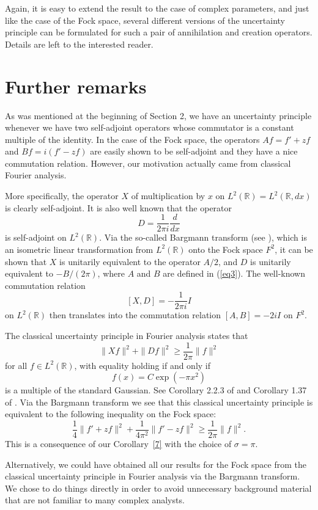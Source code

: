 \documentclass[12pt,reqno]{amsart}
\begin{document}
Again, it is easy to extend the result to the case of complex parameters, and just like the case of the Fock
space, several different versions of the uncertainty principle can be formulated for such a pair of annihilation
and creation operators. Details are left to the interested reader.

\section{Further remarks}

As was mentioned at the beginning of Section 2, we have an uncertainty principle whenever
we have two self-adjoint operators whose commutator is a constant multiple of the identity. In the case
of the Fock space, the operators $Af=f'+zf$ and $Bf=i(f'-zf)$ are easily shown to be self-adjoint and
they have a nice commutation relation. However, our motivation actually came from classical Fourier analysis.

More specifically, the operator $X$ of multiplication by $x$ on $L^2({{\mathbb R}})=L^2({{\mathbb R}},dx)$ is clearly self-adjoint.
It is also well known that the operator 
$$D=\frac1{2\pi i}\frac{d}{dx}$$ 
is self-adjoint on $L^2({{\mathbb R}})$. Via the so-called Bargmann transform (see \cite{F,G,Z}), which is an isometric linear 
transformation from $L^2({{\mathbb R}})$ onto the Fock space $F^2$, it can be shown that $X$ is unitarily equivalent to the 
operator $A/2$, and $D$ is unitarily equivalent to $-B/(2\pi)$, where $A$ and $B$ are defined in (\ref{eq3}). The 
well-known commutation relation 
$$[X,D]=-\frac1{2\pi i}I$$ on $L^2({{\mathbb R}})$ then translates into the commutation relation $[A,B]=-2i I$ on $F^2$.

The classical uncertainty principle in Fourier analysis states that
$$\|Xf\|^2+\|Df\|^2\ge\frac1{2\pi}\|f\|^2$$
for all $f\in L^2({{\mathbb R}})$, with equality holding if and only if 
$$f(x)=C\exp(-\pi x^2)$$ 
is a multiple of the standard Gaussian. See Corollary 2.2.3 of \cite{G} and Corollary 1.37 of \cite{F}. Via the Bargmann 
transform we see that this classical uncertainty principle is equivalent to the following inequality on the Fock space:
$$\frac14\|f'+zf\|^2+\frac1{4\pi^2}\|f'-zf\|^2\ge\frac1{2\pi}\|f\|^2.$$
This is a consequence of our Corollary~\ref{7} with the choice of $\sigma=\pi$.

Alternatively, we could have obtained all our results for the Fock space from the classical
uncertainty principle in Fourier analysis via the Bargmann transform. We chose to do things directly in order to
avoid unnecessary background material that are not familiar to many complex analysts.
\end{document}
